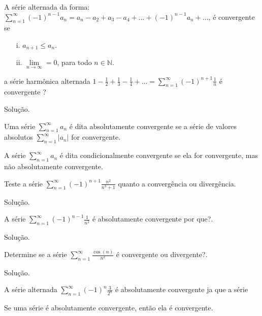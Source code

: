 A série alternada da forma: \\

$\sum_{n=1}^{\infty}(-1)^{n-1}a_{n}=a_{n}-a_{2}+a_{3}-a_{4}+...+(-1)^{n-1}a_{n}+...$, é convergente se 
\begin{itemize}
	\item[i.] $a_{n+1}\leq a_{n}$.
	\item[ii.] $\lim\limits_{n\rightarrow\infty}=0$, para todo $n\in\mathbb{N}$.
\end{itemize} 
\begin{ex}
	a série harmônica alternada $1-\frac{1}{2}+\frac{1}{3}-\frac{1}{4}+...=\sum_{n=1}^{\infty}(-1)^{n+1}\frac{1}{n}$ é convergente ?
	
	Solução.
\end{ex}
\vspace*{5cm}
\begin{df}
	Uma série $\sum_{n=1}^{\infty}a_{n}$ é dita absolutamente convergente se a série de valores absolutos $\sum_{n=1}^{\infty}|a_{n}|$ for convergente.
\end{df}
\begin{df}
	A série $\sum_{n=1}^{\infty}a_{n}$ é dita condicionalmente convergente se ela for convergente, mas não absolutamente convergente.
\end{df}
\begin{ex}
	Teste a série $\sum_{n=1}^{\infty}(-1)^{n+1}\frac{n^{2}}{n^{3}+1}$ quanto a convergência ou divergência.
	
	Solução.
\end{ex}
\vspace*{5cm}
\begin{ex}
	A série $\sum_{n=1}^{\infty}(-1)^{n-1}\frac{1}{n^{2}}$ é absolutamente convergente por que?.
	
	Solução.
\end{ex}

\vspace*{5cm}
\begin{ex}
Determine se a série $\sum_{n=1}^{\infty}\frac{\cos (n)}{n^{2}}$ é convergente ou divergente?.
	
	Solução.
\end{ex}
\vspace*{5cm}
\begin{ex}
	A série alternada $\sum_{n=1}^{\infty}(-1)^{n}\frac{3}{2^{n}}$ é absolutamente convergente ja que a série
\end{ex}
\vspace*{5cm}
\begin{teo} 
	Se uma série é absolutamente convergente, então ela é convergente.
\end{teo}
